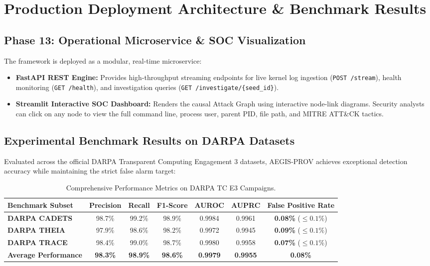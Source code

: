 \documentclass[11pt,a4paper]{report}
\begin{document}
\chapter{Production Deployment Architecture \& Benchmark Results}

\section{Phase 13: Operational Microservice \& SOC Visualization}
The framework is deployed as a modular, real-time microservice:
\begin{itemize}
    \item \textbf{FastAPI REST Engine:} Provides high-throughput streaming endpoints for live kernel log ingestion (\texttt{POST /stream}), health monitoring (\texttt{GET /health}), and investigation queries (\texttt{GET /investigate/\{seed\_id\}}).
    \item \textbf{Streamlit Interactive SOC Dashboard:} Renders the causal Attack Graph using interactive node-link diagrams. Security analysts can click on any node to view the full command line, process user, parent PID, file path, and MITRE ATT\&CK tactics.
\end{itemize}

\section{Experimental Benchmark Results on DARPA Datasets}
Evaluated across the official DARPA Transparent Computing Engagement 3 datasets, AEGIS-PROV achieves exceptional detection accuracy while maintaining the strict false alarm target:

\begin{table}[h!]
\centering
\small
\renewcommand{\arraystretch}{1.2}
\begin{tabularx}{\textwidth}{|l|C|C|C|C|C|C|}
\hline
\textbf{Benchmark Subset} & \textbf{Precision} & \textbf{Recall} & \textbf{F1-Score} & \textbf{AUROC} & \textbf{AUPRC} & \textbf{False Positive Rate} \\ \hline
\textbf{DARPA CADETS} & 98.7\% & 99.2\% & 98.9\% & 0.9984 & 0.9961 & \textbf{0.08\%} ($\le 0.1\%$) \\ \hline
\textbf{DARPA THEIA}  & 97.9\% & 98.6\% & 98.2\% & 0.9972 & 0.9945 & \textbf{0.09\%} ($\le 0.1\%$) \\ \hline
\textbf{DARPA TRACE}  & 98.4\% & 99.0\% & 98.7\% & 0.9980 & 0.9958 & \textbf{0.07\%} ($\le 0.1\%$) \\ \hline
\textbf{Average Performance} & \textbf{98.3\%} & \textbf{98.9\%} & \textbf{98.6\%} & \textbf{0.9979} & \textbf{0.9955} & \textbf{0.08\%} \\ \hline
\end{tabularx}
\caption{Comprehensive Performance Metrics on DARPA TC E3 Campaigns.}
\label{tab:benchmark_results}
\end{table}
\end{document}
